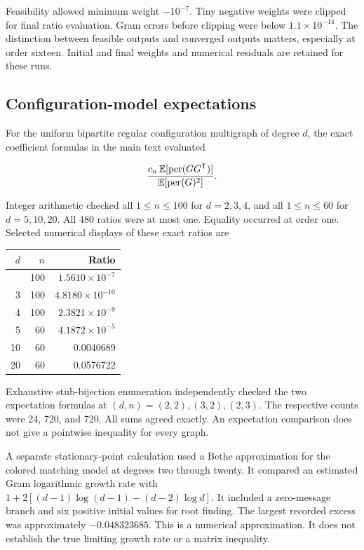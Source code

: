 Feasibility allowed minimum weight \(-10^{-7}\). Tiny negative weights were clipped for final ratio evaluation. Gram errors before clipping were below \(1.1\times10^{-14}\). The distinction between feasible outputs and converged outputs matters, especially at order sixteen. Initial and final weights and numerical residuals are retained for these runs.

\subsection{Configuration-model expectations}\label{app:finite-5}

For the uniform bipartite regular configuration multigraph of degree \(d\), the exact coefficient formulas in the main text evaluated

\[
\frac{c_n\,\mathbb E[\operatorname{per}(GG^{\mathsf{T}})]}{\mathbb E[\operatorname{per}(G)^2]}.
\]

Integer arithmetic checked all \(1\le n\le100\) for \(d=2,3,4\), and all \(1\le n\le60\) for \(d=5,10,20\). All 480 ratios were at most one. Equality occurred at order one. Selected numerical displays of these exact ratios are

{\def\LTcaptype{} %
\begin{longtable}[]{@{}rrr@{}}
\toprule\noalign{}
\(d\) & \(n\) & Ratio \\
\midrule\noalign{}
\endhead
\bottomrule\noalign{}
\endlastfoot
2 & 100 & \(1.5610\times10^{-7}\) \\
3 & 100 & \(4.8180\times10^{-10}\) \\
4 & 100 & \(2.3821\times10^{-9}\) \\
5 & 60 & \(4.1872\times10^{-5}\) \\
10 & 60 & 0.0040689 \\
20 & 60 & 0.0576722 \\
\end{longtable}
}

Exhaustive stub-bijection enumeration independently checked the two expectation formulas at \((d,n)=(2,2),(3,2),(2,3)\). The respective counts were 24, 720, and 720. All sums agreed exactly. An expectation comparison does not give a pointwise inequality for every graph.

A separate stationary-point calculation used a Bethe approximation for the colored matching model at degrees two through twenty. It compared an estimated Gram logarithmic growth rate with \(1+2[(d-1)\log(d-1)-(d-2)\log d]\). It included a zero-message branch and six positive initial values for root finding. The largest recorded excess was approximately \(-0.048323685\). This is a numerical approximation. It does not establish the true limiting growth rate or a matrix inequality.

